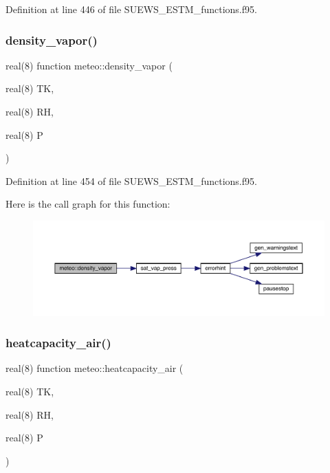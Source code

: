 Definition at line 446 of file S\+U\+E\+W\+S\+\_\+\+E\+S\+T\+M\+\_\+functions.\+f95.

\mbox{\label{namespacemeteo_a4a51e0e5cdc190c3e5eccdb69c267382}} 
\subsubsection{\texorpdfstring{density\+\_\+vapor()}{density\_vapor()}}
{\footnotesize\ttfamily real(8) function meteo\+::density\+\_\+vapor (\begin{DoxyParamCaption}\item[{real(8)}]{TK,  }\item[{real(8)}]{RH,  }\item[{real(8)}]{P }\end{DoxyParamCaption})}



Definition at line 454 of file S\+U\+E\+W\+S\+\_\+\+E\+S\+T\+M\+\_\+functions.\+f95.

Here is the call graph for this function\+:\nopagebreak
\begin{figure}[H]
\begin{center}
\leavevmode
\includegraphics[width=350pt]{namespacemeteo_a4a51e0e5cdc190c3e5eccdb69c267382_cgraph}
\end{center}
\end{figure}
\mbox{\label{namespacemeteo_a1c0a3877fc85ffd63bbf91b3e710b602}} 
\subsubsection{\texorpdfstring{heatcapacity\+\_\+air()}{heatcapacity\_air()}}
{\footnotesize\ttfamily real(8) function meteo\+::heatcapacity\+\_\+air (\begin{DoxyParamCaption}\item[{real(8)}]{TK,  }\item[{real(8)}]{RH,  }\item[{real(8)}]{P }\end{DoxyParamCaption})}



